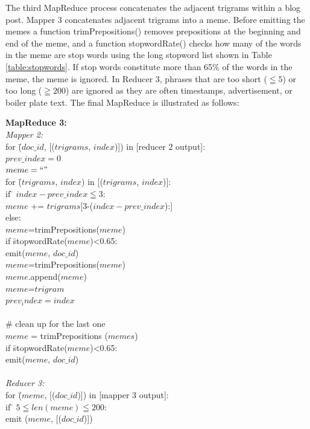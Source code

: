 \documentclass{sig-alternate}
\begin{document}
The third MapReduce process concatenates the adjacent trigrams within a blog post. Mapper 3 concatenates adjacent trigrams into a meme. Before emitting the memes a function trimPrepositions() removes prepositions at the beginning and end of the meme, and a function stopwordRate() checks how many of the words in the meme are stop words using the long stopword list shown in Table \ref{table:stopwords}. If stop words constitute more than 65\% of the words in the meme, the meme is ignored. In Reducer 3, phrases that are too short ($\leqq 5$) or too long ($\geqq 200$) are ignored as they are often timestamps, advertisement, or boiler plate text. The final MapReduce is illustrated as follows:

\begin{centering}
\begin{tabbing}
\textbf{MapReduce 3:}\\
\emph{Mapper 2:}\\

for \= ($doc\_id$, [($trigrams$, $index$)]) in [reducer 2 output]:\\
\>	$prev\_index=0$\\
\>	$meme=``"$\\
\>	for \= ($trigrams$, $index$) in [($trigrams$, $index$)]:\\
\>\>	if \= $index-prev\_index \leqq 3$:\\
\>\>\>		$meme$ += $trigrams$[3-($index-prev\_index$):]\\
\>\>	else:\\
\>\>\>		$meme$=trimPrepositions($meme$)\\
\>\>\>		if \= stopwordRate($meme$)<0.65:\\
\>\>\>\>		emit($meme$, $doc\_id$)\\
\>\>\>		$meme$=trimPrepositions($meme$)\\
\>\>\>		$meme$.append($meme$)\\
\>\>\>		$meme$=$trigram$\\
\>\>	$prev_index=index$\\
\\	
\>	\# clean up for the last one\\
\>		$meme$ = trimPrepositions ($memes$)\\
\>		if \= stopwordRate($meme$)<0.65:\\
\>\>		emit($meme$, $doc\_id$)\\
\\
\emph{Reducer 3:}\\
for \= ($meme$, [($doc\_id$)]) in [mapper 3 output]:\\
\> if \= $5 \leqq len(meme) \leqq 200$:\\
\>\>	emit ($meme$, [($doc\_id$)])

\end{tabbing}

\end{centering}
\end{document}
